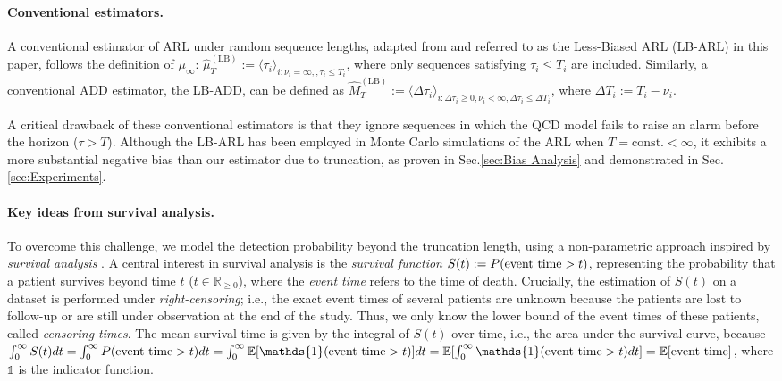 \documentclass{article}
\theoremstyle{plain}
\theoremstyle{definition}
\theoremstyle{remark}
\def\mbr{\mathbb{R}}
\def\mbe{\mathbb{E}}
\def\mbone{\mathds{1}}
\begin{document}
\paragraph{Conventional estimators.}
A conventional estimator of ARL under random sequence lengths, adapted from \citep{qiu2013introduction} and referred to as the Less-Biased ARL (LB-ARL) in this paper, follows the definition of $\mu_\infty$:
$\hat{\mu}_{T}^\mathrm{(LB)} := \langle \tau_i \rangle_{i:\nu_i = \infty,, \tau_i \leq T_i}$,
where only sequences satisfying $\tau_i \leq T_i$ are included.
Similarly, a conventional ADD estimator, the LB-ADD, can be defined as $\hat{M}_T^\mathrm{(LB)} := \langle \Delta \tau_i \rangle_{i: \Delta \tau_i \geq 0, \nu_i < \infty, \Delta \tau_i \leq \Delta T_i}$, where $\Delta T_i := T_i - \nu_i$.

A critical drawback of these conventional estimators is that they ignore sequences in which the QCD model fails to raise an alarm before the horizon ($\tau > T$). Although the LB-ARL has been employed in Monte Carlo simulations of the ARL \citep{qiu2013introduction, lim2025efficient} when $T = \mathrm{const.} < \infty$, it exhibits a more substantial negative bias than our estimator due to truncation, as proven in Sec.\ref{sec:Bias Analysis} and demonstrated in Sec.\ref{sec:Experiments}.

\paragraph{Key ideas from survival analysis.}
To overcome this challenge, we model the detection probability beyond the truncation length, using a non-parametric approach inspired by \textit{survival analysis} \citep{kleinbaum1996survival}.
A central interest in survival analysis is the \textit{survival function} $S(t) := P({\rm event \,\, time} > t)$, representing the probability that a patient survives beyond time $t$ ($t \in \mbr_{\geq 0}$), where the \textit{event time} refers to the time of death.
Crucially, the estimation of $S(t)$ on a dataset is performed under \textit{right-censoring}; i.e., the exact event times of several patients are unknown because the patients are lost to follow-up or are still under observation at the end of the study. 
Thus, we only know the lower bound of the event times of these patients, called \textit{censoring times}.
The mean survival time is given by the integral of $S(t)$ over time, i.e., the area under the survival curve, because
$
\int_0^\infty S(t) dt 
= \int_0^\infty P({\rm event \,\, time} > t) dt 
= \int_0^\infty \mbe[\mbone({\rm event \,\, time} > t)] dt
= \mbe[ \int_0^\infty \mbone({\rm event \,\, time} > t) dt]
= \mbe[{\rm event \,\, time}]
$, 
where $\mbone$ is the indicator function.
\end{document}
